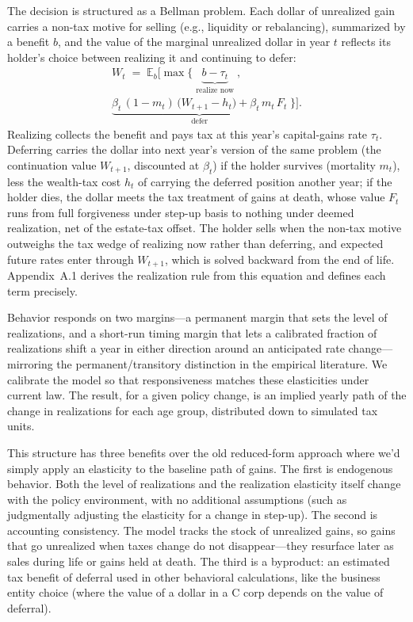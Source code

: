 \documentclass[10pt,twocolumn]{article}
\begin{document}
The decision is structured as a Bellman problem. Each dollar of unrealized
gain carries a non-tax motive for selling (e.g., liquidity or rebalancing),
summarized by a benefit $b$, and the value of the marginal unrealized dollar
in year $t$ reflects its holder's choice between realizing it and continuing
to defer:
\begin{multline*}
W_t \;=\; \mathbb{E}_b\Big[\max\Big\{\;\underbrace{b - \tau_t}_{\text{realize now}}\;,\\[2pt]
\underbrace{\beta_t\,(1-m_t)\,\big(W_{t+1} - h_t\big) + \beta_t\, m_t\, F_t}_{\text{defer}}\;\Big\}\Big].
\end{multline*}
Realizing collects the benefit and pays tax at this year's capital-gains rate
$\tau_t$. Deferring carries the dollar into next year's version of the same
problem (the continuation value $W_{t+1}$, discounted at $\beta_t$) if the
holder survives (mortality $m_t$), less the wealth-tax cost $h_t$ of carrying
the deferred position another year; if the holder dies, the dollar meets the
tax treatment of gains at death, whose value $F_t$ runs from full forgiveness
under step-up basis to nothing under deemed realization, net of the estate-tax
offset. The holder sells when the non-tax motive outweighs the tax wedge of
realizing now rather than deferring, and expected future rates enter through
$W_{t+1}$, which is solved backward from the end of life. Appendix~A.1
derives the realization rule from this equation and defines each term
precisely.

Behavior responds on two
margins---a permanent margin that sets the level of realizations, and a
short-run timing margin that lets a calibrated fraction of realizations shift
a year in either direction around an anticipated rate change---mirroring the
permanent/transitory distinction in the empirical literature. We calibrate the
model so that responsiveness matches these elasticities under current law. The
result, for a given policy change, is an implied yearly path of the change in realizations for each age group, distributed down to simulated tax
units.

This structure has three benefits over the old reduced-form approach where
we'd simply apply an elasticity to the baseline path of gains. The first is
endogenous behavior. Both the level of realizations and the realization
elasticity itself change with the policy environment, with no additional
assumptions (such as judgmentally adjusting the elasticity for a change in
step-up). The second is accounting consistency. The model tracks the stock of
unrealized gains, so gains that go unrealized when taxes change do not
disappear---they resurface later as sales during life or gains held at death.
The third is a byproduct: an estimated tax benefit of deferral used in other
behavioral calculations, like the business entity choice (where the value of a
dollar in a C corp depends on the value of deferral).
\end{document}
